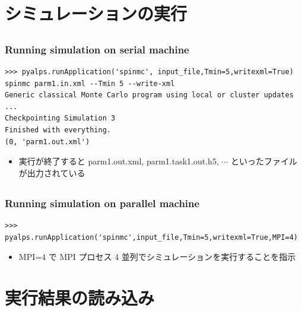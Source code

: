 \section{シミュレーションの実行}
\subsection*{\redm\whiteb\greenb}

\begin{frame}[t,fragile]
\frametitle{Running simulation on serial machine}
\begin{lstlisting}
>>> pyalps.runApplication('spinmc', input_file,Tmin=5,writexml=True)
spinmc parm1.in.xml --Tmin 5 --write-xml
Generic classical Monte Carlo program using local or cluster updates
...
Checkpointing Simulation 3
Finished with everything.
(0, 'parm1.out.xml')
\end{lstlisting}
\begin{itemize}
\item 実行が終了すると parm1.out.xml, parm1.task1.out.h5, $\cdots$ といったファイルが出力されている
\end{itemize}
 
\end{frame}

\subsection*{\redm\whitem\greenb}

\begin{frame}[t,fragile]
\frametitle{Running simulation on parallel machine}
\begin{lstlisting}
>>> pyalps.runApplication('spinmc',input_file,Tmin=5,writexml=True,MPI=4)
\end{lstlisting}
\begin{itemize}
\item MPI=4 で MPI プロセス 4 並列でシミュレーションを実行することを指示
\end{itemize}

\end{frame}

\section{実行結果の読み込み}
\subsection*{\redm\whiteb\greenb}

